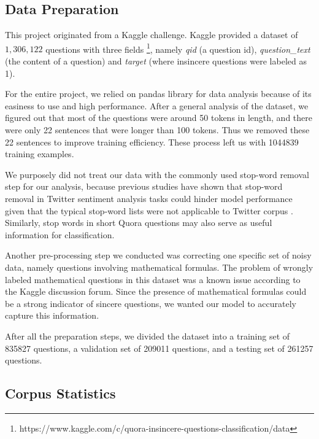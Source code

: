 \documentclass[12pt]{diazessay} %
\begin{document}
\subsection{Data Preparation} \label{data}
This project originated from a Kaggle challenge. Kaggle provided a dataset of $1,306,122$ questions with three fields \footnote{https://www.kaggle.com/c/quora-insincere-questions-classification/data}, namely \textit{qid} (a question id), \textit{question\_text} (the content of a question) and \textit{target} (where insincere questions were labeled as 1). 

For the entire project, we relied on pandas library for data analysis because of its easiness to use and high performance. After a general analysis of the dataset, we figured out that most of the questions were around 50 tokens in length, and there were only 22 sentences that were longer than 100 tokens. Thus we removed these 22 sentences to improve training efficiency. These process left us with \num[group-separator={,}]{1044839} training examples.  

We purposely did not treat our data with the commonly used stop-word removal step for our analysis, because previous studies have shown that stop-word removal in Twitter sentiment analysis tasks could hinder model performance given that the typical stop-word lists were not applicable to Twitter corpus \citep{giachanou2016}. Similarly, stop words in short Quora questions may also serve as useful information for classification. 

Another pre-processing step we conducted was correcting one specific set of noisy data, namely questions involving mathematical formulas. The problem of wrongly labeled mathematical questions in this dataset was a known issue according to the Kaggle discussion forum. Since the presence of mathematical formulas could be a strong indicator of sincere questions, we wanted our model to accurately capture this information.

After all the preparation steps, we divided the dataset into a training set of 835827 questions, a validation set of 209011 questions, and a testing set of 261257 questions. 

\subsection{Corpus Statistics} \label{corpus-stats}
\end{document}
